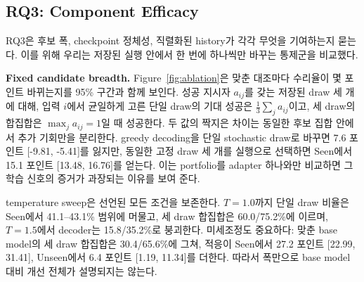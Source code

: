 \documentclass[10pt,conference]{IEEEtran}
\begin{document}
\subsection{RQ3: Component Efficacy}

RQ3은 후보 폭, checkpoint 정체성, 직렬화된 history가 각각 무엇을 기여하는지 묻는다. 이를 위해 우리는 저장된 실행 안에서 한 번에 하나씩만 바꾸는 통제군을 비교했다.

\noindent\textbf{Fixed candidate breadth.} Figure~\ref{fig:ablation}은 맞춘 대조마다 수리율이 몇 포인트 바뀌는지를 95\% 구간과 함께 보인다. 성공 지시자 \(a_{ij}\)를 갖는 저장된 draw 세 개에 대해, 입력 \(i\)에서 균일하게 고른 단일 draw의 기대 성공은 \(\frac{1}{3}\sum_j a_{ij}\)이고, 세 draw의 합집합은 \(\max_j a_{ij}=1\)일 때 성공한다. 두 값의 짝지은 차이는 동일한 후보 집합 안에서 추가 기회만을 분리한다. greedy decoding을 단일 stochastic draw로 바꾸면 7.6 포인트 [-9.81, -5.41]를 잃지만, 동일한 고정 draw 세 개를 실행으로 선택하면 Seen에서 15.1 포인트 [13.48, 16.76]를 얻는다. 이는 portfolio를 adapter 하나와만 비교하면 그 학습 신호의 증거가 과장되는 이유를 보여 준다.

temperature sweep은 선언된 모든 조건을 보존한다. \(T=1.0\)까지 단일 draw 비율은 Seen에서 41.1--43.1\% 범위에 머물고, 세 draw 합집합은 60.0/75.2\%에 이르며, \(T=1.5\)에서 decoder는 15.8/35.2\%로 붕괴한다. 미세조정도 중요하다: 맞춘 base model의 세 draw 합집합은 30.4/65.6\%에 그쳐, 적응이 Seen에서 27.2 포인트 [22.99, 31.41], Unseen에서 6.4 포인트 [1.19, 11.34]를 더한다. 따라서 폭만으로 base model 대비 개선 전체가 설명되지는 않는다.
\end{document}
